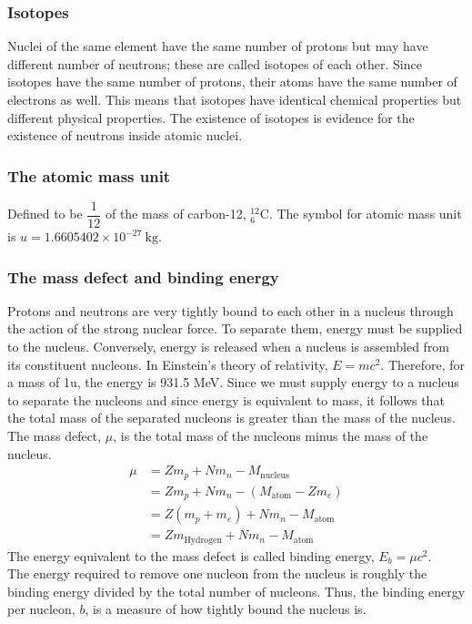 \subsubsection*{Isotopes}
Nuclei of the same element have the same number of protons but may have different number of neutrons; these are called isotopes of each other. Since isotopes have the same number of protons, their atoms have the same number of electrons as well. This means that isotopes have identical chemical properties but different physical properties. The existence of isotopes is evidence for the existence of neutrons inside atomic nuclei.
\subsubsection*{The atomic mass unit}
Defined to be $\dfrac{1}{12}$ of the mass of carbon-12, $^{12}_6\text{C}$. The symbol for atomic mass unit is $u=1.6605402 \times 10^{-27}\ \text{kg}$.
\subsubsection*{The mass defect and binding energy}
Protons and neutrons are very tightly bound to each other in a nucleus through the action of the strong nuclear force. To separate them, energy must be supplied to the nucleus. Conversely, energy is released when a nucleus is assembled from its constituent nucleons.
In Einstein's theory of relativity, $E=mc^2$. Therefore, for a mass of 1u, the energy is 931.5 MeV. Since we must supply energy to a nucleus to separate the nucleons and since energy is equivalent to mass, it follows that the total mass of the separated nucleons is greater than the mass of the nucleus. The mass defect, $\mu$, is the total mass of the nucleons minus the mass of the nucleus.
\[
\begin{aligned}
\mu&=Zm_p+Nm_n-M_\text{nucleus}\\
&=Zm_p+Nm_n-(M_\text{atom}-Zm_e)\\
&=Z(m_p+m_e)+Nm_n-M_\text{atom}\\
&=Zm_\text{Hydrogen}+Nm_n-M_\text{atom}
\end{aligned}\]
The energy equivalent to the mass defect is called binding energy, $E_b=\mu c^2$.\\
The energy required to remove one nucleon from the nucleus is roughly the binding energy divided by the total number of nucleons. Thus, the binding energy per nucleon, $b$, is a measure of how tightly bound the nucleus is.
